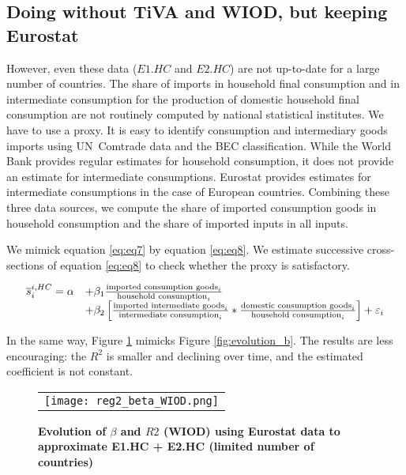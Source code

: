 \documentclass[11pt,a4paper]{article}
\begin{document}
\subsection{Doing without TiVA and WIOD, but keeping Eurostat}
However, even these data ($E1.HC$ and $E2.HC$) are not up-to-date for a large number of countries. 
The share of imports in household final consumption and in intermediate consumption for the production of domestic household final consumption are not routinely computed by national statistical institutes. 
We have to use a proxy. It is easy to identify consumption and intermediary goods imports using UN Comtrade data and the BEC classification. 
While the World Bank provides regular estimates for household consumption, it does not provide an estimate for intermediate consumptions. Eurostat provides estimates for intermediate consumptions in the case of European countries.
Combining these three data sources, we compute the share of imported consumption goods in household consumption and the share of imported inputs in all inputs. 

We mimick equation \ref{eq:eq7} by equation \ref{eq:eq8}. 
We estimate successive cross-sections of equation \ref{eq:eq8} to check whether the proxy is satisfactory. 

 \begin{equation}
 \begin{array}{llll}
\overline{s}_{i}^{i,HC}= \alpha &+  \beta_1  \frac{\textnormal{imported consumption goods}_i}{\textnormal{household consumption}_i} \\ & +  \beta_2  \left[    \frac{\textnormal{imported intermediate goods}_i}{\textnormal{intermediate consumption}_i}*\frac{\textnormal{domestic consumption goods}_i}{\textnormal{household consumption}_i}\right] +\varepsilon_i 
\end{array} 
\label{eq:eq8}
\end{equation}


In the same way, Figure \ref{fig:evolution_b_reg2} mimicks Figure \ref{fig:evolution_b}. 
The results are less encouraging: the $R^2$ is smaller and declining over time, and the estimated coefficient is not constant.


\begin{figure}[!h]
	\centering
	\caption{\footnotesize{\textbf{Evolution of $\beta$ and $R2$ (WIOD) using Eurostat data to approximate E1.HC + E2.HC (limited number of countries)}}}
	\begin{tabular}{c}
		\texttt{[image: reg2\_beta\_WIOD.png]}\\
	\end{tabular}
	\label{fig:evolution_b_reg2}
\end{figure}
\end{document}
